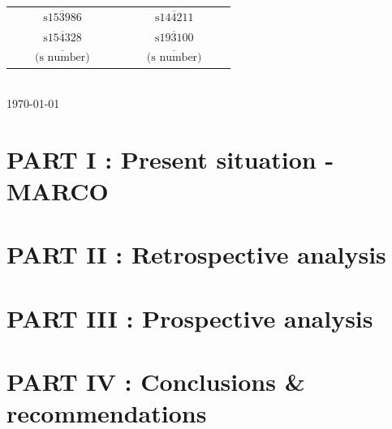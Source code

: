 \documentclass[12pt]{article}
\begin{document}
\begin{titlepage}
{
}


\begin{tabular}{cc}
 $\overline{\qquad\text{s153986}\qquad}$ \quad& \quad
 $\overline{\qquad\text{s144211}\qquad}$ \\ [1cm]
 $\overline{\qquad\text{s154328}\qquad}$ \quad& \quad
 $\overline{\qquad\text{s193100}\qquad}$ \\[1cm]
  $\overline{\qquad\text{(s number)}\qquad}$ \quad& \quad
 $\overline{\qquad\text{(s number)}\qquad}$ \\
\end{tabular}\\[1cm]

{\small
\today %
}
\\[0.2cm] %



\end{titlepage}

\newpage
\tableofcontents

\newpage
\section{PART I : Present situation - MARCO}


\newpage
\section{PART II : Retrospective analysis}


\newpage
\section{PART III : Prospective analysis}


\newpage
\section{PART IV : Conclusions \& recommendations}



\newpage


\end{document}
